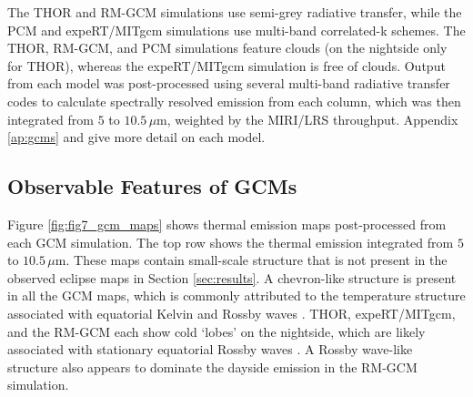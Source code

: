 \documentclass[twocolumn]{aastex631}
\begin{document}
The THOR and RM-GCM simulations use semi-grey radiative transfer, while the PCM and expeRT/MITgcm simulations use multi-band correlated-k schemes. The THOR, RM-GCM, and PCM simulations feature clouds (on the nightside only for THOR), whereas the expeRT/MITgcm simulation is free of clouds. Output from each model was post-processed using several multi-band radiative transfer codes to calculate spectrally resolved emission from each column, which was then integrated from $5$ to $10.5\,\mu\text{m}$, weighted by the MIRI/LRS throughput. Appendix \ref{ap:gcms} and \citet{bell2023wasp43b} give more detail on each model.

\subsection{Observable Features of GCMs}\label{sec:discussion:gcms}

Figure \ref{fig:fig7_gcm_maps} shows thermal emission maps post-processed from each GCM simulation. The top row shows the thermal emission integrated from $5$ to $10.5\,\mu\text{m}$. These maps contain small-scale structure that is not present in the observed eclipse maps in Section \ref{sec:results}. A chevron-like structure is present in all the GCM maps, which is commonly attributed to the temperature structure associated with equatorial Kelvin and Rossby waves \citep{matsuno1966quasi,showman2011equatorial,lewis2022temperature}. THOR, expeRT/MITgcm, and the RM-GCM each show cold `lobes' on the nightside, which are likely associated with stationary equatorial Rossby waves \citep{matsuno1966quasi,showman2011equatorial,lewis2022temperature}. A Rossby wave-like structure also appears to dominate the dayside emission in the RM-GCM simulation. 
\end{document}
